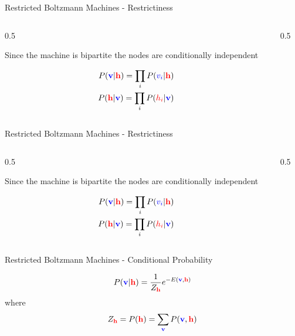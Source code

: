 \documentclass{beamer}
\newcommand{\vi}{\color{blue}v_i\color{black}}
\newcommand{\hi}{\color{red}h_i\color{black}}
\newcommand{\vbf}{\color{blue}\mathbf{v}\color{black}}
\newcommand{\hbf}{\color{red}\mathbf{h}\color{black}}
\begin{document}
\begin{frame}{Restricted Boltzmann Machines - Restrictiness}

\def\layersep{2.5cm}

\begin{columns}
\begin{column}{0.5\textwidth}
  \color{reddish}
  \begin{flushleft}
Since the machine is bipartite the nodes are conditionally independent
\end{flushleft}
\color{black}
\begin{eqnarray*}
  P(\vbf|\hbf)=\prod_{i}P(\vi|\hbf)\cr
  P(\hbf|\vbf)=\prod_{i}P(\hi|\vbf)\cr
\end{eqnarray*}
\end{column}
\begin{column}{0.5\textwidth}
\begin{center}  

\end{center}
\end{column}
\end{columns}

\end{frame}


\begin{frame}{Restricted Boltzmann Machines - Restrictiness}

\def\layersep{2.5cm}

\begin{columns}
\begin{column}{0.5\textwidth}
  \color{reddish}
  \begin{flushleft}
Since the machine is bipartite the nodes are conditionally independent
\end{flushleft}
\color{black}
\begin{eqnarray*}
  P(\vbf|\hbf)=\prod_{i}P(\vi|\hbf)\cr
  P(\hbf|\vbf)=\prod_{i}P(\hi|\vbf)\cr
\end{eqnarray*}
\end{column}
\begin{column}{0.5\textwidth}
\begin{center}  

\end{center}
\end{column}
\end{columns}

\end{frame}


\begin{frame}{Restricted Boltzmann Machines - Conditional Probability}

$$
  P(\vbf|\hbf)=\frac{1}{Z_{\hbf} } e^{-E(\vbf,\hbf)}
$$
  \color{reddish}where\color{black}{}
$$
  Z_{\hbf}=P(\hbf)=\sum_{\vbf} P(\vbf,\hbf)
  $$
\end{frame}
\end{document}
